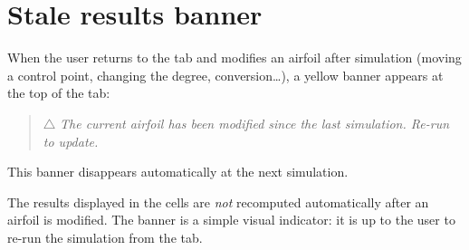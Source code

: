 \section{Stale results banner}

When the user returns to the  tab and modifies
an airfoil after simulation (moving a control point,
changing the degree, conversion\dots), a yellow banner appears
at the top of the  tab:

\begin{quote}
\textcolor{orange!75!black}{$\triangle$
\emph{The current airfoil has been modified since the last
simulation. Re-run to update.}}
\end{quote}

This banner disappears automatically at the next simulation.

\begin{important}
The results displayed in the cells are \emph{not}
recomputed automatically after an airfoil is modified.
The banner is a simple visual indicator: it is up
to the user to re-run the simulation from the
 tab.
\end{important}
